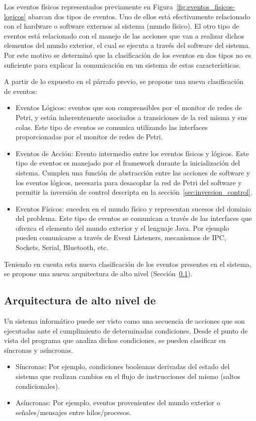 Los eventos físicos representados previamente en
Figura~\ref{fig:eventos_fisicos-logicos} abarcan dos tipos de eventos. Uno de
ellos está efectivamente relacionado con el hardware o software externos al
sistema (mundo físico). El otro tipo de eventos está relacionado con el manejo
de las acciones que van a realizar dichos elementos del mundo exterior, el cual
se ejecuta a través del software del sistema.
Por este motivo se determinó que la clasificación de los
eventos en dos tipos no es suficiente para explicar la comunicación en un
sistema de estas características. 

A partir de lo expuesto en el párrafo previo, se propone una nueva clasificación
de eventos:

\begin{itemize}
    \item Eventos Lógicos: eventos que son comprensibles por el monitor de
    redes de Petri, y están inherentemente asociados a transiciones de la red
    misma y sus colas. Este tipo de eventos se comunica utilizando las
    interfaces proporcionadas por el monitor de redes de Petri.
    \item Eventos de Acción: Evento intermedio
    entre los eventos físicos y lógicos. Este tipo de eventos es manejado
    por el framework durante la inicialización del sistema. Cumplen una función
    de abstracción entre las acciones de software y los eventos lógicos,
    necesaria para desacoplar la red de Petri del software y permitir la
    inversión de control descripta en la sección~\ref{sec:inversion_control}.
    \item Eventos Físicos: suceden en el mundo físico y representan sucesos del
    dominio del problema. Este tipo de eventos se comunican a través de las
    interfaces que ofrezca el elemento del mundo exterior y el lenguaje Java.
    Por ejemplo pueden comunicarse a través de Event Listeners, mecanismos
    de IPC, Sockets, Serial, Bluetooth, etc.
\end{itemize}

Teniendo en cuenta esta nueva clasificación de los eventos presentes en el
sistema, se propone una nueva arquitectura de alto nivel
(Sección~\ref{sec:arquitectura_alto_nivel}).

\subsection{Arquitectura de alto nivel de \nombreFramework}
\label{sec:arquitectura_alto_nivel}
Un sistema informático puede ser visto como una secuencia de acciones que son
ejecutadas ante el cumplimiento de determinadas condiciones. Desde el punto de
vista del programa que analiza dichas condiciones, se pueden clasificar
en síncronas y asíncronas.
  \begin{itemize}
	\item Síncronas: Por ejemplo, condiciones booleanas derivadas del estado del
		sistema que realizan cambios en el flujo de instrucciones del mismo (saltos
		condicionales).
	\item Asíncronas: Por ejemplo, eventos provenientes del mundo exterior o
		señales/mensajes entre hilos/procesos.
  \end{itemize}

